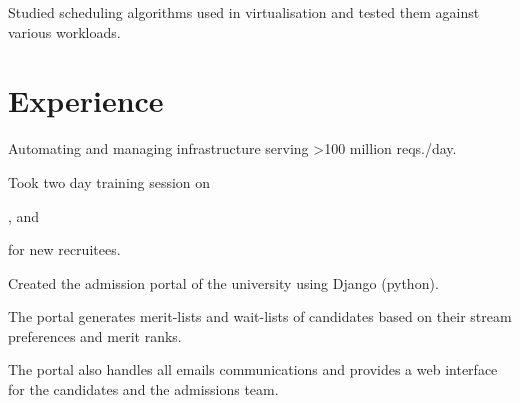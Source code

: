 \documentclass[]{deedy}
\begin{document}
\begin{minipage}[t]{0.66\textwidth}
\begin{tightemize}
\item Studied scheduling algorithms used in virtualisation and tested them against various workloads.
\end{tightemize}


\section{Experience}

\begin{tightemize}
\item Automating and managing infrastructure serving >100 million reqs./day.
\item Took two day training session on 
\begin{enumerate*}[label=(\roman*)]
  \item {}, and
  \item {}
\end{enumerate*}
 for new recruitees.
\end{tightemize}
\sectionsep

\begin{tightemize}
\item Created the admission portal of the university using Django (python).
\item The portal generates merit-lists and wait-lists of candidates based on their stream preferences and merit ranks. 
\item The portal also handles all emails communications and provides a web interface for the candidates and the admissions team.
\end{tightemize}
\sectionsep



\end{minipage}
\end{document}
